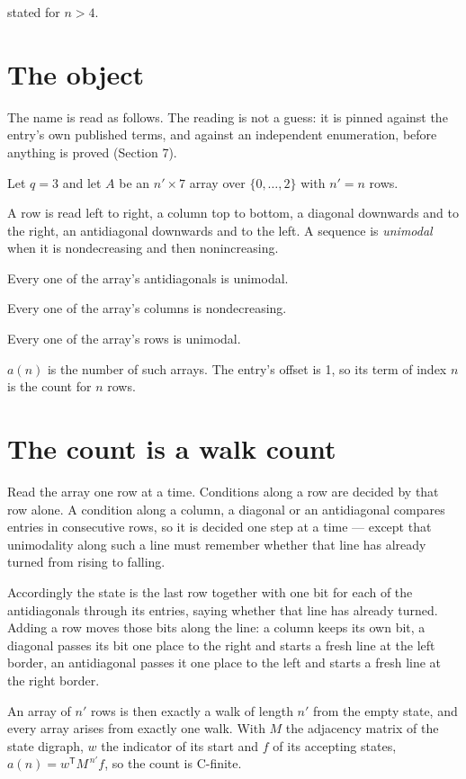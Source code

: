\documentclass[11pt]{article}
\theoremstyle{definition}
\begin{document}
stated for $n > 4$.

\section{The object}

The name is read as follows. The reading is not a guess: it is pinned against the entry's own published terms, and against an independent enumeration, before anything is proved (Section 7).

Let $q = 3$ and let $A$ be an $n' \times 7$ array over $\{0,\dots,2\}$ with $n' = n$ rows.

A row is read left to right, a column top to bottom, a diagonal downwards and to the right, an antidiagonal downwards and to the left. A sequence is {\itshape unimodal} when it is nondecreasing and then nonincreasing.

Every one of the array's antidiagonals is unimodal.

Every one of the array's columns is nondecreasing.

Every one of the array's rows is unimodal.

$a(n)$ is the number of such arrays. The entry's offset is 1, so its term of index $n$ is the count for $n$ rows.

\section{The count is a walk count}

Read the array one row at a time. Conditions along a row are decided by that row alone. A condition along a column, a diagonal or an antidiagonal compares entries in consecutive rows, so it is decided one step at a time --- except that unimodality along such a line must remember whether that line has already turned from rising to falling.

Accordingly the state is the last row together with one bit for each of the antidiagonals through its entries, saying whether that line has already turned. Adding a row moves those bits along the line: a column keeps its own bit, a diagonal passes its bit one place to the right and starts a fresh line at the left border, an antidiagonal passes it one place to the left and starts a fresh line at the right border.

An array of $n'$ rows is then exactly a walk of length $n'$ from the empty state, and every array arises from exactly one walk. With $M$ the adjacency matrix of the state digraph, $w$ the indicator of its start and $f$ of its accepting states, $a(n) = w^{\mathsf T}M^{\,n'}f$, so the count is C-finite.
\end{document}
